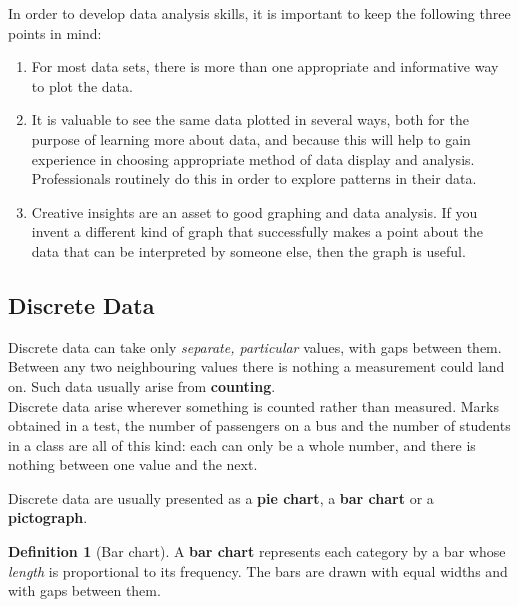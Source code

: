 \documentclass[11pt,a4paper]{article}
\theoremstyle{definition}
\newtheorem{definition}[thm]{Definition}
\begin{document}
In order to develop data analysis skills, it is important to keep the following three points in mind:
\begin{enumerate}
\item For most data sets, there is more than one appropriate and informative way to plot the data.
\item It is valuable to see the same data plotted in several ways, both for the purpose of learning more about data, and because this will help to gain experience in choosing appropriate method of data display and analysis. Professionals routinely do this in order to explore patterns in their data.
\item Creative insights are an asset to good graphing and data analysis. If you invent a different kind of graph that successfully makes a point about the data that can be interpreted by someone else, then the graph is useful.\\
\end{enumerate}















\subsection{Discrete Data}
Discrete data can take only \emph{separate, particular} values, with gaps between them.
Between any two neighbouring values there is nothing a measurement could land on. Such data
usually arise from \textbf{counting}.\\


Discrete data arise wherever something is counted rather than measured. Marks obtained in
a test, the number of passengers on a bus and the number of students in a class are all of
this kind: each can only be a whole number, and there is nothing between one value and the
next.



Discrete data are usually presented as a \textbf{pie chart}, a \textbf{bar chart} or a
\textbf{pictograph}.

\begin{definition}[Bar chart]
A \textbf{bar chart} represents each category by a bar whose \emph{length} is proportional
to its frequency. The bars are drawn with equal widths and with gaps between them.
\end{definition}
\end{document}
